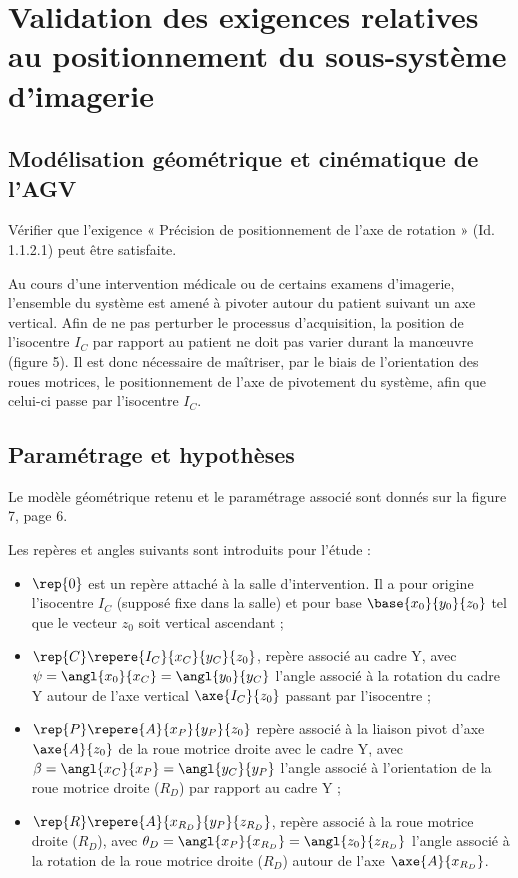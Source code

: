 \section{Validation des exigences relatives au positionnement du sous-système d’imagerie}
\subsection{Modélisation géométrique et cinématique de l’AGV}
\begin{obj}
Vérifier que l’exigence « Précision de positionnement de l’axe de rotation » (Id. 1.1.2.1) peut
être satisfaite.
\end{obj}


Au cours d’une intervention médicale ou de certains examens d’imagerie, l’ensemble du système
est amené à pivoter autour du patient suivant un axe vertical. Afin de ne pas perturber le processus
d’acquisition, la position de l’isocentre $I_C$ par rapport au patient ne doit pas varier durant la manœuvre
(figure 5). Il est donc nécessaire de maîtriser, par le biais de l’orientation des roues motrices, le
positionnement de l’axe de pivotement du système, afin que celui-ci passe par l’isocentre $I_C$.

\subsection*{Paramétrage et hypothèses}

Le modèle géométrique retenu et le paramétrage associé sont donnés sur la figure 7, page 6.

Les repères et angles suivants sont introduits pour l’étude :
\begin{itemize}
\item $\rep{0}$ est un repère attaché à la salle d’intervention. Il a pour origine l’isocentre $I_C$ (supposé fixe
dans la salle) et pour base $\base{x_{0}}{y_{0}}{z_{0}}$ tel que le vecteur $z_{0}$ soit vertical ascendant ;
\item $\rep{C} \repere{I_C}{x_{C}}{y_{C}}{z_{0}}$, repère associé au cadre Y, avec $\psi = \angl{x_{0}}{x_{C}}= \angl{y_{0}}{y_{C}}$ l’angle associé à la
rotation du cadre Y autour de l’axe vertical $\axe{I_C}{z_{0}}$ passant par l’isocentre ;
\item $\rep{P}\repere{A}{x_{P}}{y_{P}}{z_{0}}$ repère associé à la liaison pivot d’axe $\axe{A}{z_{0}}$ de la roue motrice droite avec le
cadre Y, avec $\beta = \angl{x_{C}}{x_{P}}= \angl{y_{C}}{y_{P}}$ l’angle associé à l’orientation de la roue motrice droite
($R_D$) par rapport au cadre Y ;
\item $\rep{R}\repere{A}{x_{R_D}}{y_{P}}{z_{R_D}}$, repère associé à la roue motrice droite ($R_D$), avec $\theta_D = \angl{x_{P}}{x_{R_D}}= \angl{z_{0}}{z_{R_D}}$ 
l’angle associé à la rotation de la roue motrice droite ($R_D$) autour de l’axe $\axe{A}{x_{R_D}}$.
\end{itemize}

